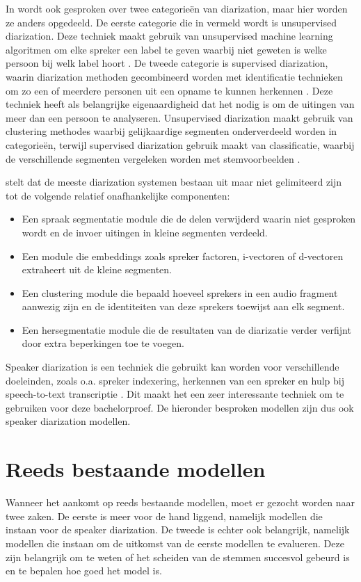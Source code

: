 In \textcite{Khoma2023} wordt ook gesproken over twee categorieën van diarization, maar hier worden ze anders opgedeeld. De eerste categorie die in \textcite{Khoma2023} vermeld wordt is unsupervised diarization. Deze techniek maakt gebruik van unsupervised machine learning algoritmen om elke spreker een label te geven waarbij niet geweten is welke persoon bij welk label hoort \autocite{Khoma2023}. De tweede categorie is supervised diarization, waarin diarization methoden gecombineerd worden met identificatie technieken om zo een of meerdere personen uit een opname te kunnen herkennen \autocite{Khoma2023}. Deze techniek heeft als belangrijke eigenaardigheid dat het nodig is om de uitingen van meer dan een persoon te analyseren\autocite{Khoma2023}. Unsupervised diarization maakt gebruik van clustering methodes waarbij gelijkaardige segmenten onderverdeeld worden in categorieën, terwijl supervised diarization gebruik maakt van classificatie, waarbij de verschillende segmenten vergeleken worden met stemvoorbeelden \autocite{Khoma2023}.

\textcite{Zhang2018} stelt dat de meeste diarization systemen bestaan uit maar niet gelimiteerd zijn tot de volgende relatief onafhankelijke componenten:
\begin{itemize}
	\item Een spraak segmentatie module die de delen verwijderd waarin niet gesproken wordt en de invoer uitingen in kleine segmenten verdeeld.
	\item Een module die embeddings zoals spreker factoren, i-vectoren of d-vectoren extraheert uit de kleine segmenten.
	\item Een clustering module die bepaald hoeveel sprekers in een audio fragment aanwezig zijn en de identiteiten van deze sprekers toewijst aan elk segment.
	\item Een hersegmentatie module die de resultaten van de diarizatie verder verfijnt door extra beperkingen toe te voegen.
\end{itemize}

Speaker diarization is een techniek die gebruikt kan worden voor verschillende doeleinden, zoals o.a. spreker indexering, herkennen van een spreker en hulp bij speech-to-text transcriptie \autocite{AngueraMiro2012}. Dit maakt het een zeer interessante techniek om te gebruiken voor deze bachelorproef. De hieronder besproken modellen zijn dus ook speaker diarization modellen.

\section{Reeds bestaande modellen}
Wanneer het aankomt op reeds bestaande modellen, moet er gezocht worden naar twee zaken. De eerste is meer voor de hand liggend, namelijk modellen die instaan voor de speaker diarization. De tweede is echter ook belangrijk, namelijk modellen die instaan om de uitkomst van de eerste modellen te evalueren. Deze zijn belangrijk om te weten of het scheiden van de stemmen succesvol gebeurd is en te bepalen hoe goed het model is.

